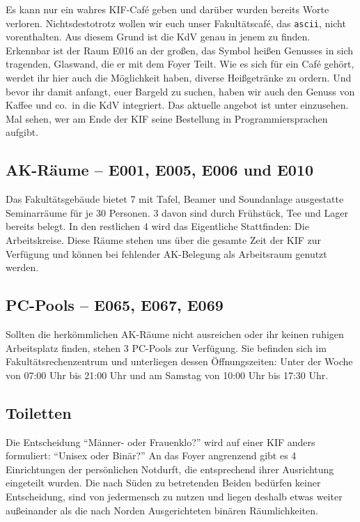 Es kann nur ein wahres KIF-Café geben und darüber wurden bereits Worte verloren.
Nichtsdestotrotz wollen wir euch unser Fakultätscafé, das \texttt{ascii}, nicht vorenthalten.
Aus diesem Grund ist die KdV genau in jenem zu finden.
Erkennbar ist der Raum E016 an der großen, das Symbol heißen Genusses in sich tragenden, Glaswand, die er mit dem Foyer Teilt.
Wie es sich für ein Café gehört, werdet ihr hier auch die Möglichkeit haben, diverse Heißgetränke zu ordern.
Und bevor ihr damit anfangt, euer Bargeld zu suchen, haben wir auch den Genuss von Kaffee und co.\ in die KdV integriert.
Das aktuelle angebot ist unter  einzusehen.
Mal sehen, wer am Ende der KIF seine Bestellung in Programmiersprachen aufgibt.


\subsection*{AK-Räume -- E001, E005, E006 und E010}
Das Fakultätsgebäude bietet 7 mit Tafel, Beamer und Soundanlage ausgestatte Seminarräume für je 30 Personen.
3 davon sind durch Frühstück, Tee und Lager bereits belegt.
In den restlichen 4 wird das Eigentliche Stattfinden: Die Arbeitskreise.
Diese Räume stehen uns über die gesamte Zeit der KIF zur Verfügung und können bei fehlender AK-Belegung als Arbeitsraum genutzt werden.

\subsection*{PC-Pools -- E065, E067, E069}
Sollten die herkömmlichen AK-Räume nicht ausreichen oder ihr keinen ruhigen Arbeitsplatz finden, stehen 3 PC-Pools zur Verfügung.
Sie befinden sich im Fakultätsrechenzentrum und unterliegen dessen Öffnungszeiten:
Unter der Woche von 07:00 Uhr bis 21:00 Uhr und am Samstag von 10:00 Uhr bis 17:30 Uhr.

\subsection*{Toiletten}
Die Entscheidung \enquote{Männer- oder Frauenklo?} wird auf einer KIF anders formuliert: \enquote{Unisex oder Binär?}
An das Foyer angrenzend gibt es 4 Einrichtungen der persönlichen Notdurft, die entsprechend ihrer Ausrichtung eingeteilt wurden.
Die nach Süden zu betretenden Beiden bedürfen keiner Entscheidung, sind von jedermensch zu nutzen und liegen deshalb etwas weiter außeinander als die nach Norden Ausgerichteten binären Räumlichkeiten.

